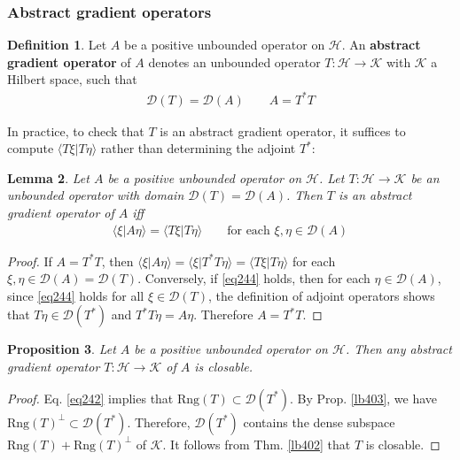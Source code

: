 \documentclass[12pt,b5paper,notitlepage]{article}
\theoremstyle{definition}
\newtheorem{df}{Definition}[subsection]
\theoremstyle{plain}
\newtheorem{pp}[df]{Proposition}
\newtheorem{lm}[df]{Lemma}
\newcommand{\Dom}{\mathscr{D}}
\newcommand{\bk}[1]{\langle {#1}\rangle}
\newcommand{\Rng}{\mathrm{Rng}}
\newcommand{\MH}{\mathcal H}
\newcommand{\MK}{\mathcal K}
\numberwithin{equation}{section}
\begin{document}
\subsubsection{Abstract gradient operators}








\begin{df}
Let $A$ be a positive unbounded operator on $\MH$. An \textbf{abstract gradient operator}  of $A$ denotes an unbounded operator $T:\MH\rightarrow\MK$ with $\MK$ a Hilbert space, such that
\begin{align}\label{eq242}
\Dom(T)=\Dom(A)\qquad A=T^*T
\end{align} 
\end{df}


In practice, to check that $T$ is an abstract gradient operator, it suffices to compute $\bk{T\xi|T\eta}$ rather than determining the adjoint $T^*$:

\begin{lm}\label{lb466}
Let $A$ be a positive unbounded operator on $\MH$. Let $T:\MH\rightarrow\MK$ be an unbounded operator with domain $\Dom(T)=\Dom(A)$. Then $T$ is an abstract gradient operator of $A$ iff
\begin{align}\label{eq244}
\bk{\xi|A\eta}=\bk{T\xi|T\eta}\qquad\text{for each }\xi,\eta\in\Dom(A)
\end{align}
\end{lm}

\begin{proof}
If $A=T^*T$, then $\bk{\xi|A\eta}=\bk{\xi|T^*T\eta}=\bk{T\xi|T\eta}$ for each $\xi,\eta\in\Dom(A)=\Dom(T)$. Conversely, if \eqref{eq244} holds, then for each $\eta\in\Dom(A)$, since \eqref{eq244} holds for all $\xi\in\Dom(T)$, the definition of adjoint operators shows that $T\eta\in\Dom(T^*)$ and $T^*T\eta=A\eta$. Therefore $A=T^*T$.
\end{proof}




\begin{pp}\label{lb468}
Let $A$ be a positive unbounded operator on $\MH$. Then any abstract gradient operator $T:\MH\rightarrow\MK$ of $A$ is closable.
\end{pp}


\begin{proof}
Eq. \eqref{eq242} implies that $\Rng(T)\subset\Dom(T^*)$. By Prop. \ref{lb403}, we have $\Rng(T)^\perp\subset\Dom(T^*)$. Therefore, $\Dom(T^*)$ contains the dense subspace $\Rng(T)+\Rng(T)^\perp$ of $\MK$. It follows from Thm. \ref{lb402} that $T$ is closable.
\end{proof}
\end{document}

